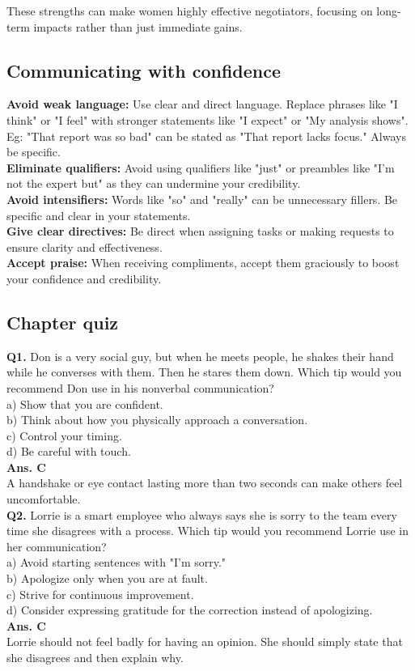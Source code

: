 \documentclass[12pt]{article}
\begin{document}
These strengths can make women highly effective negotiators, focusing on long-term impacts rather than just immediate gains.

\subsection{Communicating with confidence}
\textbf{Avoid weak language:}  Use clear and direct language. Replace phrases like "I think" or "I feel" with stronger statements like "I expect" or "My analysis shows".\\
Eg: "That report was so bad" can be stated as "That report lacks focus." Always be specific.\\
\textbf{Eliminate qualifiers:}  Avoid using qualifiers like "just" or preambles like "I'm not the expert but" as they can undermine your credibility.\\
\textbf{Avoid intensifiers:}  Words like "so" and "really" can be unnecessary fillers. Be specific and clear in your statements.\\
\textbf{Give clear directives:}  Be direct when assigning tasks or making requests to ensure clarity and effectiveness.\\
\textbf{Accept praise:} When receiving compliments, accept them graciously to boost your confidence and credibility.

\subsection{Chapter quiz}
\textbf{Q1.} Don is a very social guy, but when he meets people, he shakes their hand while he converses with them. Then he stares them down. Which tip would you recommend Don use in his nonverbal communication?\\
a) Show that you are confident. \\
b) Think about how you physically approach a conversation.\\
c) Control your timing. \\
d) Be careful with touch. \\
\textbf{Ans. C} \\
A handshake or eye contact lasting more than two seconds can make others feel uncomfortable.\\
\textbf{Q2.} Lorrie is a smart employee who always says she is sorry to the team every time she disagrees with a process. Which tip would you recommend Lorrie use in her communication?\\
a) Avoid starting sentences with "I'm sorry." \\
b) Apologize only when you are at fault.\\
c) Strive for continuous improvement.\\
d) Consider expressing gratitude for the correction instead of apologizing. \\
\textbf{Ans. C} \\
Lorrie should not feel badly for having an opinion. She should simply state that she disagrees and then explain why.
\end{document}
